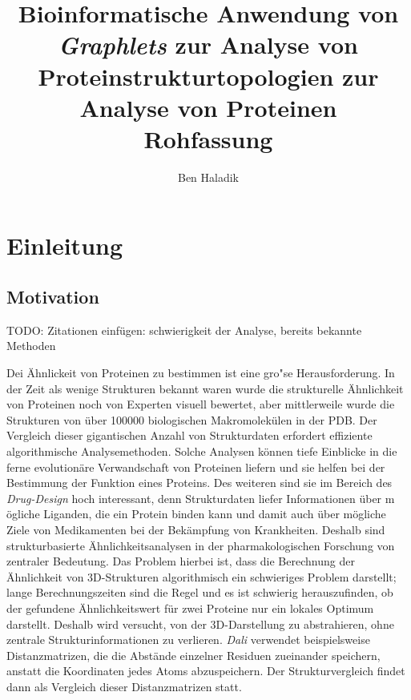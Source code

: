 \documentclass{report}
\author{Ben Haladik}
\title{Bioinformatische Anwendung von \textit{Graphlets} zur Analyse von Proteinstrukturtopologien zur Analyse von Proteinen \\ Rohfassung}
\begin{document}
\maketitle

\newpage

\tableofcontents

\newpage

\chapter{Einleitung}

\section{Motivation}

TODO: Zitationen einf\"ugen: schwierigkeit der Analyse, bereits bekannte Methoden

Dei \"Ahnlickeit von Proteinen zu bestimmen ist eine gro"se Herausforderung. In der Zeit als wenige Strukturen bekannt waren wurde die strukturelle \"Ahnlichkeit von Proteinen noch von Experten visuell bewertet, aber mittlerweile wurde die Strukturen von \"uber 100000 biologischen Makromolek\"ulen in der PDB. Der Vergleich dieser gigantischen Anzahl von Strukturdaten erfordert effiziente algorithmische Analysemethoden. Solche Analysen k\"onnen tiefe Einblicke in die ferne evolution\"are Verwandschaft von Proteinen liefern und sie helfen bei der Bestimmung der Funktion eines Proteins. Des weiteren sind sie im Bereich des \textit{Drug-Design} hoch interessant, denn  Strukturdaten liefer Informationen \"uber m \"ogliche Liganden, die ein Protein binden kann und damit auch \"uber m\"ogliche Ziele von Medikamenten bei der Bek\"ampfung von Krankheiten. Deshalb sind strukturbasierte \"Ahnlichkeitsanalysen in der pharmakologischen Forschung von zentraler Bedeutung.
Das Problem hierbei ist, dass die Berechnung der \"Ahnlichkeit von 3D-Strukturen algorithmisch ein schwieriges Problem darstellt; lange Berechnungszeiten sind die Regel und es ist schwierig herauszufinden, ob der gefundene \"Ahnlichkeitswert f\"ur zwei Proteine nur ein lokales Optimum darstellt.
Deshalb wird versucht, von der 3D-Darstellung zu abstrahieren, ohne zentrale Strukturinformationen zu verlieren. \emph{Dali} \cite{dali}verwendet beispielsweise Distanzmatrizen, die die Abst\"ande einzelner Residuen zueinander speichern, anstatt die Koordinaten jedes Atoms abzuspeichern.
Der Strukturvergleich findet dann als Vergleich dieser Distanzmatrizen statt.
\end{document}
